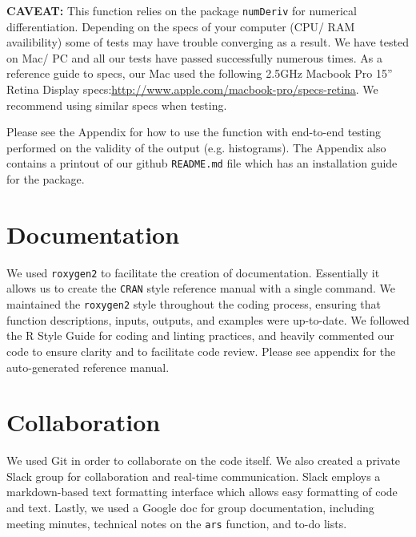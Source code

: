 \documentclass{article}\usepackage[]{graphicx}\usepackage[]{color}
\begin{document}
\textbf{CAVEAT:} This function relies on the package \texttt{numDeriv} for numerical 
differentiation. Depending on the specs of your computer (CPU/ RAM availibility) 
some of tests may have trouble converging as a result. We have tested on Mac/ PC 
and all our tests have passed successfully numerous times. As a reference guide 
to specs, our Mac used the following 2.5GHz Macbook Pro 15'' Retina Display specs:\url{http://www.apple.com/macbook-pro/specs-retina}. We recommend using similar specs when testing.

Please see the Appendix for how to use the function with end-to-end testing performed on the 
validity of the output (e.g. histograms). The Appendix also contains a printout of 
our github \texttt{README.md} file which has an installation guide for the package.

\section{Documentation}

We used \texttt{roxygen2} to facilitate the creation of documentation. 
Essentially it allows us to create the \texttt{CRAN} style reference manual with 
a single command. We maintained the \texttt{roxygen2} style throughout the coding process, 
ensuring that function descriptions, inputs, outputs, and examples were up-to-date.
We followed the R Style Guide for coding and linting practices,
and heavily commented our code to ensure clarity and to facilitate code
review. Please see appendix for the auto-generated reference manual.

\section{Collaboration}

We used Git in order to collaborate on the code itself. We also created a
private Slack group for collaboration and real-time communication.
Slack employs a markdown-based text formatting interface which allows
easy formatting of code and text.
Lastly, we used a Google doc for group documentation, including
meeting minutes, technical notes on the \texttt{ars} function,
and to-do lists.
\end{document}
